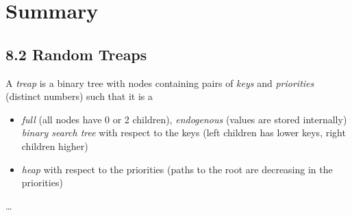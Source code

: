 \section*{Summary}

\subsection*{8.2 Random Treaps}

\begin{definition}
A \emph{treap} is a binary tree with nodes containing pairs of \emph{keys} and \emph{priorities} (distinct numbers) such that it is a
\begin{itemize}
  \item \emph{full} (all nodes have 0 or 2 children), \emph{endogenous} (values are stored internally) \emph{binary search tree} with respect to the keys (left children has lower keys, right children higher)
  \item \emph{heap} with respect to the priorities (paths to the root are decreasing in the priorities)
\end{itemize}
\end{definition}

\ldots
